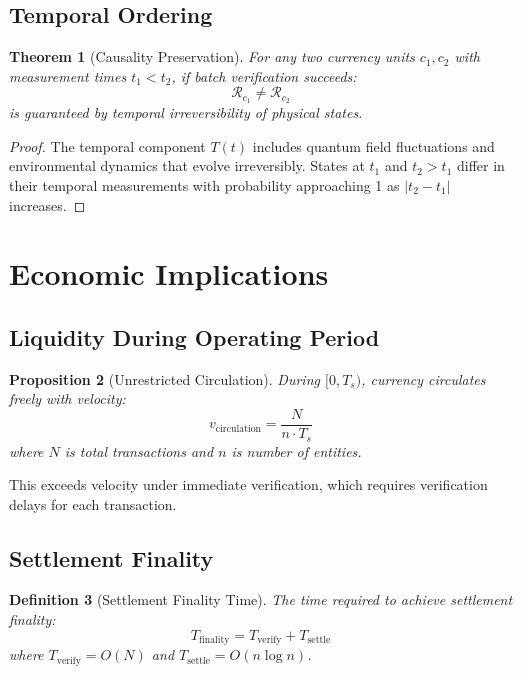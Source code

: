 \documentclass[12pt]{article}
\newtheorem{theorem}{Theorem}
\newtheorem{definition}[theorem]{Definition}
\newtheorem{proposition}[theorem]{Proposition}
\begin{document}
\subsection{Temporal Ordering}

\begin{theorem}[Causality Preservation]
For any two currency units $c_1, c_2$ with measurement times $t_1 < t_2$, if batch verification succeeds:
$$
\mathcal{R}_{c_1} \neq \mathcal{R}_{c_2}
$$
is guaranteed by temporal irreversibility of physical states.
\end{theorem}

\begin{proof}
The temporal component $T(t)$ includes quantum field fluctuations and environmental dynamics that evolve irreversibly. States at $t_1$ and $t_2 > t_1$ differ in their temporal measurements with probability approaching 1 as $|t_2 - t_1|$ increases.
\end{proof}

\section{Economic Implications}

\subsection{Liquidity During Operating Period}

\begin{proposition}[Unrestricted Circulation]
During $[0, T_s)$, currency circulates freely with velocity:
$$
v_{\text{circulation}} = \frac{N}{n \cdot T_s}
$$
where $N$ is total transactions and $n$ is number of entities.
\end{proposition}

This exceeds velocity under immediate verification, which requires verification delays for each transaction.

\subsection{Settlement Finality}

\begin{definition}[Settlement Finality Time]
The time required to achieve settlement finality:
$$
T_{\text{finality}} = T_{\text{verify}} + T_{\text{settle}}
$$
where $T_{\text{verify}} = O(N)$ and $T_{\text{settle}} = O(n\log n)$.
\end{definition}
\end{document}
